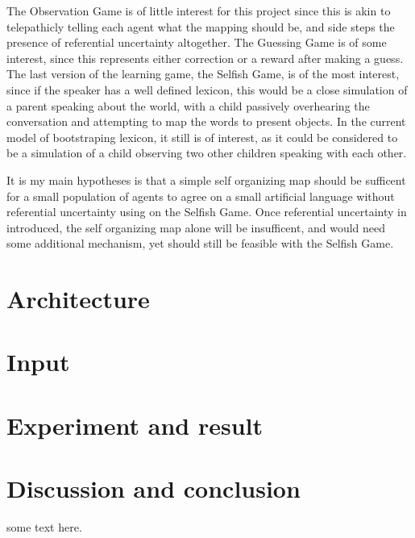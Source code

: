 \documentclass[11pt]{article}
\begin{document}
The Observation Game is of little interest for this project since this is akin
to telepathicly telling each agent what the mapping should be, and side steps the
presence of referential uncertainty altogether.  The Guessing Game is of some
interest, since this represents either correction or a reward after making a
guess.  The last version of the learning game, the Selfish Game, is of the most
interest, since if the speaker has a well defined lexicon, this would be a close
simulation of a parent speaking about the world, with a child passively
overhearing the conversation and attempting to map the words to present objects.
In the current model of bootstraping lexicon, it still is of interest, as it
could be considered to be a simulation of a child observing two other children
speaking with each other.

It is my main hypotheses is that a simple self organizing map should be sufficent for
a small population of agents to agree on a small artificial language without
referential uncertainty using on the Selfish Game.  Once referential
uncertainty in introduced, the self organizing map alone will be insufficent,
and would need some additional mechanism, yet should still be feasible with the
Selfish Game.
\section{Architecture}
\section{Input}
\section{Experiment and result}
\section{Discussion and conclusion}
some text here.


\end{document}
